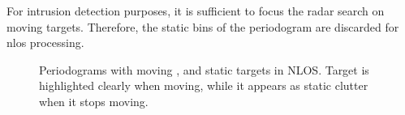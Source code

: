 	For intrusion detection purposes, it is sufficient to focus the radar search on moving targets. 
	Therefore, the static bins of the periodogram are discarded for \gls{nlos} processing.
	\begin{figure}[H]
		\centering
		
		\hfill
		
		\caption[]{Periodograms with moving , and static  targets in NLOS.
			Target is highlighted clearly when moving, while it appears as static clutter when it stops moving.}
		\label{fig:Rad_clutter_comparison}
	\end{figure}
	
